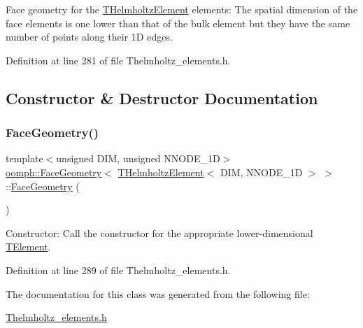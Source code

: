 Face geometry for the \hyperlink{classoomph_1_1THelmholtzElement}{T\+Helmholtz\+Element} elements\+: The spatial dimension of the face elements is one lower than that of the bulk element but they have the same number of points along their 1D edges. 

Definition at line 281 of file Thelmholtz\+\_\+elements.\+h.



\subsection{Constructor \& Destructor Documentation}
\mbox{\label{classoomph_1_1FaceGeometry_3_01THelmholtzElement_3_01DIM_00_01NNODE__1D_01_4_01_4_a6d4d6ea22279cc5b7e16dbbb2036ebb3}} 
\subsubsection{\texorpdfstring{Face\+Geometry()}{FaceGeometry()}}
{\footnotesize\ttfamily template$<$unsigned D\+IM, unsigned N\+N\+O\+D\+E\+\_\+1D$>$ \\
\hyperlink{classoomph_1_1FaceGeometry}{oomph\+::\+Face\+Geometry}$<$ \hyperlink{classoomph_1_1THelmholtzElement}{T\+Helmholtz\+Element}$<$ D\+IM, N\+N\+O\+D\+E\+\_\+1D $>$ $>$\+::\hyperlink{classoomph_1_1FaceGeometry}{Face\+Geometry} (\begin{DoxyParamCaption}{ }\end{DoxyParamCaption})\hspace{0.3cm}{\ttfamily [inline]}}



Constructor\+: Call the constructor for the appropriate lower-\/dimensional \hyperlink{classoomph_1_1TElement}{T\+Element}. 



Definition at line 289 of file Thelmholtz\+\_\+elements.\+h.



The documentation for this class was generated from the following file\+:\begin{DoxyCompactItemize}
\item 
\hyperlink{Thelmholtz__elements_8h}{Thelmholtz\+\_\+elements.\+h}\end{DoxyCompactItemize}
